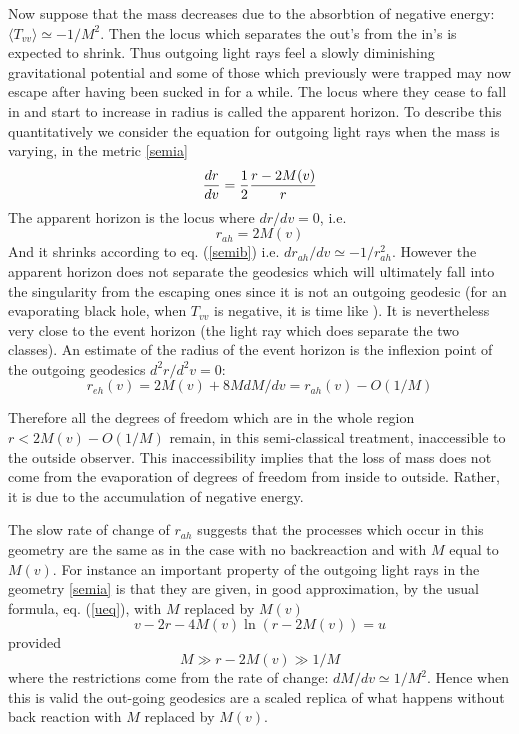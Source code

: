\documentclass[12pt,oneside]{report}
\begin{document}
Now suppose that the mass decreases due to the absorbtion of
negative energy: $\langle T_{vv} \rangle \simeq -1/M^2$.
 Then the locus which separates the out's
from the in's is expected to shrink. Thus outgoing light
rays feel a slowly diminishing  gravitational potential
and some of those which previously were trapped may now
escape after having been sucked in for a while. The locus
where they cease to fall in and start to increase in
radius is called the apparent horizon. To describe this
quantitatively we consider the equation for outgoing light
rays when the mass is varying, in the metric \ref{semia}
\begin{equation}
{dr \over dv} = {1 \over 2} {r-2 M(v) \over r}
\label{semic}
\end{equation}
The apparent horizon is the locus where $dr/dv =0$, i.e.
\begin{equation}
r_{ah}=2M(v)
\label{rah}
\end{equation}
And it shrinks according to eq. (\ref{semib}) 
 i.e. $dr_{ah}/dv \simeq -1
/ r_{ah}^2$. However the apparent horizon does not separate
the geodesics which will ultimately fall into  the
singularity from the escaping ones since it is not an outgoing geodesic (for an evaporating
black hole, when $T_{vv}$ is negative, it is time like
 \cite{EH}). It 
is nevertheless very close to the event horizon (the light
ray which does separate the two classes). An estimate of the 
radius of the event horizon is
the inflexion point of the outgoing geodesics $d^2r/d^2v =0$: 
\begin{equation}
r_{eh}(v) = 2 M(v) + 8 M
dM/dv =  r_{ah}(v)  - O(1 / M)
\label{reh}
\end{equation}

 Therefore all the degrees of freedom which are in
the whole region $r<2M(v) -O(1/M)$ remain, in this semi-classical
treatment, inaccessible to the
outside observer.
This inaccessibility implies that the loss of mass does
not come from the evaporation of degrees of freedom from
inside to outside. Rather, it is due to the accumulation
of negative energy. 

The slow rate of change of $r_{ah}$ suggests that the processes which 
occur in this geometry are the same as in the case with no backreaction and
with $M$ equal to $M(v)$. For instance an important
property of the outgoing light rays in the
geometry \ref{semia} is that they are given, in good approximation,
 by the usual
formula, eq. (\ref{ueq}), with $M$ replaced by $M(v)$
\begin{equation}
v-2r -4M(v) \ln (r-2M(v)) =u
\label{semid}
\end{equation}
provided
\begin{equation}
M\gg r-2M(v) \gg 1/M
\end{equation}
where the restrictions come from the rate of change: $dM/dv  \simeq 1/M^2$.
Hence when this is valid the out-going geodesics are a scaled
replica of what happens without back reaction with $M$
replaced by $M(v)$. 
\end{document}
